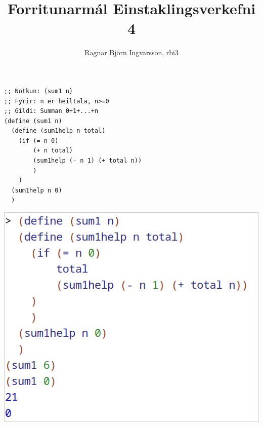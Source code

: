 \documentclass{article}
\title{Forritunarmál Einstaklingsverkefni 4}
\author{Ragnar Björn Ingvarsson, rbi3}
\begin{document}
\renewcommand\thepage{}
	
	\maketitle

	\newpage
	\setcounter{page}{1}
	\renewcommand\thepage{\arabic{page}}

	\section{}
	\begin{verbatim}
;; Notkun: (sum1 n)
;; Fyrir: n er heiltala, n>=0
;; Gildi: Summan 0+1+...+n
(define (sum1 n)
  (define (sum1help n total)
	(if (= n 0)
		(+ n total)
		(sum1help (- n 1) (+ total n))
		)
	)
  (sum1help n 0)
  )
	\end{verbatim}

	\begin{center}
		\includegraphics[scale=0.35]{sum1.png}
	\end{center}

	\newpage
\end{document}
